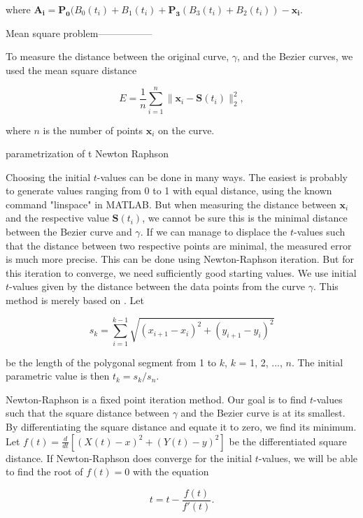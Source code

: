 \documentclass[10pt]{article}
\begin{document}
where $\mathbf{A_i} = \mathbf{P_0}(B_0(t_i) + B_1(t_i) + \mathbf{P_3}(B_3(t_i) + B_2(t_i)) - \mathbf{x_i}$.




Mean square problem-----------------

To measure the distance between the original curve, $\gamma$, and the Bezier curves, we used the mean square distance 

\begin{equation}
E = \frac{1}{n} \sum_{i=1}^{n} \|\mathbf{x}_i - \mathbf{S}(t_i)\|^2_2,
\end{equation}

where $n$ is the number of points $\mathbf{x}_i$ on the curve. 

parametrization of t
Newton Raphson

Choosing the initial $t$-values can be done in many ways. The easiest is probably to generate values ranging from 0 to 1 with equal distance, using the known command "linspace" in MATLAB. But when measuring the distance between $\mathbf{x}_i$ and the respective value $\mathbf{S}(t_i)$, we cannot be sure this is the minimal distance between the Bezier curve and $\gamma$. If we can manage to displace the $t$-values such that the distance between two respective points are minimal, the measured error is much more precise. This can be done using Newton-Raphson iteration. But for this iteration to converge, we need sufficiently good starting values. We use initial $t$-values given by the distance between the data points from the curve $\gamma$. This method is merely based on \cite{Plass:1983}. Let

\begin{equation}
s_k = \sum_{i=1}^{k-1} \sqrt{(x_{i+1}-x_i)^2 + (y_{i+1}-y_i)^2}
\end{equation}

be the length of the polygonal segment from 1 to $k$, $k$ = 1, 2, ..., $n$. The initial parametric value is then $t_k = s_k/s_n$.

Newton-Raphson is a fixed point iteration method. Our goal is to find $t$-values such that the square distance between $\gamma$ and the Bezier curve is at its smallest. By  differentiating the square distance and equate it to zero, we find its minimum. Let $f(t) = \frac{d}{dt} [(X(t)-x)^2 + (Y(t)-y)^2 ]$ be the differentiated square distance. If Newton-Raphson does converge for the initial $t$-values, we will be able to find the root of $f(t) = 0$ with the equation

\begin{equation}
t = t - \frac{f(t)}{f'(t)}.
\end{equation}
\end{document}
